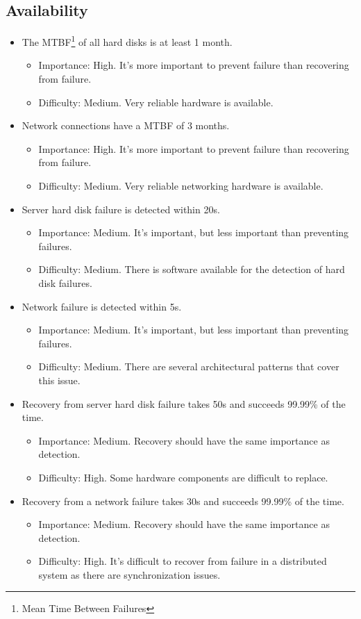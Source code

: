 \documentclass[a4paper,11pt]{report}
\begin{document}
\subsection{Availability}
\begin{itemize}
\item[\textbf{A1.1}] The MTBF\footnote{Mean Time Between Failures} of all hard disks is at least 1 month.
\begin{itemize}
\item Importance: High. It's more important to prevent failure than recovering from failure.
\item Difficulty: Medium. Very reliable hardware is available.
\end{itemize}
\item[\textbf{A1.2}] Network connections have a MTBF of 3 months.
\begin{itemize}
\item Importance: High. It's more important to prevent failure than recovering from failure.
\item Difficulty: Medium. Very reliable networking hardware is available.
\end{itemize}
\item[\textbf{A2.1}] Server hard disk failure is detected within 20s.
\begin{itemize}
\item Importance: Medium. It's important, but less important than preventing failures.
\item Difficulty: Medium. There is software available for the detection of hard disk failures.
\end{itemize}
\item[\textbf{A2.2}] Network failure is detected within 5s.
\begin{itemize}
\item Importance: Medium. It's important, but less important than preventing failures.
\item Difficulty: Medium. There are several architectural patterns that cover this issue.
\end{itemize}
\item[\textbf{A3.1}] Recovery from server hard disk failure takes 50s and succeeds 99.99\% of the time.
\begin{itemize}
\item Importance: Medium. Recovery should have the same importance as detection.
\item Difficulty: High. Some hardware components are difficult to replace.
\end{itemize}
\item[\textbf{A3.2}] Recovery from a network failure takes 30s and succeeds 99.99\% of the time.
\begin{itemize}
\item Importance: Medium. Recovery should have the same importance as detection.
\item Difficulty: High. It's difficult to recover from failure in a distributed system as there are synchronization issues.
\end{itemize}
\end{itemize}
\end{document}
